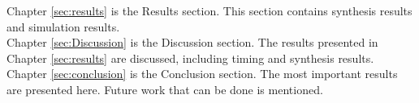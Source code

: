 Chapter \ref{sec:results} is the Results section. This section contains synthesis results and simulation results.
\\

Chapter \ref{sec:Discussion} is the Discussion section. The results presented in Chapter \ref{sec:results} are discussed, including timing and synthesis results.
\\

Chapter \ref{sec:conclusion} is the Conclusion section. The most important results are presented here.  Future work that can be done is mentioned.
\\




